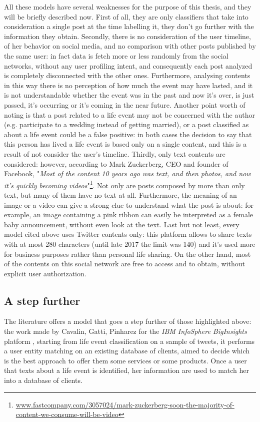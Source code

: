 All these models have several weaknesses for the purpose of this thesis, and they will be briefly described now. First of all, they are only classifiers that take into consideration a single post at the time labelling it, they don't go further with the information they obtain. Secondly, there is no consideration of the user timeline, of her behavior on social media, and no comparison with other posts published by the same user: in fact data is fetch more or less randomly from the social networks, without any user profiling intent, and consequently each post analyzed is completely disconnected with the other ones. Furthermore, analysing contents in this way there is no perception of how much the event may have lasted, and it is not understandable whether the event was in the past and now it's over, is just passed, it's occurring or it's coming in the near future. Another point worth of noting is that a post related to a life event may not be concerned with the author (e.g. participate to a wedding instead of getting married), or a post classified as about a life event could be a false positive: in both cases the decision to say that this person has lived a life event is based only on a single content, and this is a result of not consider the user's timeline. Thirdly, only text contents are considered: however, according to Mark Zuckerberg, CEO and founder of Facebook, "\textit{Most of the content 10 years ago was text, and then photos, and now it's quickly becoming videos}"\footnote{\url{www.fastcompany.com/3057024/mark-zuckerberg-soon-the-majority-of-content-we-consume-will-be-video}}. Not only are posts composed by more than only text, but many of them have no text at all. Furthermore, the meaning of an image or a video can give a strong clue to understand what the post is about: for example, an image containing a pink ribbon can easily be interpreted as a female baby announcement, without even look at the text. Last but not least, every model cited above uses Twitter contents only: this platform allows to share texts with at most 280 characters (until late 2017 the limit was 140) and it's used more for business purposes rather than personal life sharing. On the other hand, most of the contents on this social network are free to access and to obtain, without explicit user authorization.

\subsection{A step further}
The literature offers a model that goes a step further of those highlighted above: the work made by Cavalin, Gatti, Pinharez for the \textit{IBM InfoSphere BigInsights} platform \cite{cavalin2014towards}, starting from life event classification on a sample of tweets, it performs a user entity matching on an existing database of clients, aimed to decide which is the best approach to offer them some services or some products. Once a user that texts about a life event is identified, her information are used to match her into a database of clients.

